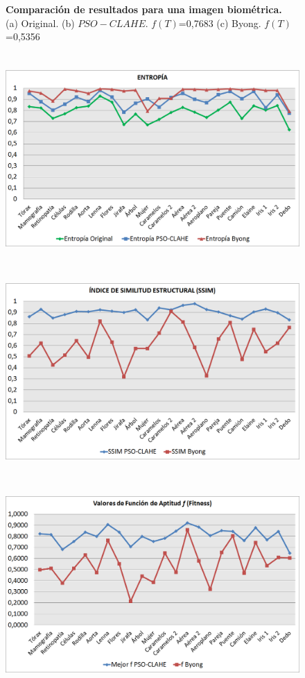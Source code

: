 \documentclass[a0,landscape,spanish]{a0poster}
\begin{document}
\begin{multicols}{3}
\begin{figure}[H]
  \caption{\textbf{Comparación de resultados para una imagen biométrica.} \\
(a) Original. (b) $PSO-CLAHE$. $f(T)$=0,7683 (c) Byong. $f(T)$=0,5356}
\label{fig:resultado_iris}
\end{figure}
\begin{figure}[H]
    \centering
    \includegraphics[height=8cm]{grafica1}
    \hspace{1pt}
    \includegraphics[height=8cm]{grafica2}
    \hspace{1pt}
    \includegraphics[height=8cm]{grafica3}
    \hspace{1pt}


\end{figure}
\end{multicols}
\end{document}
